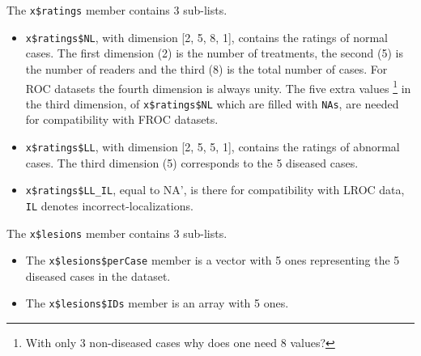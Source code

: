 \documentclass[
]{book}
\newenvironment{Shaded}{\begin{snugshade}}{\end{snugshade}}
\newcommand{\CommentTok}[1]{\textcolor[rgb]{0.56,0.35,0.01}{\textit{#1}}}
\newcommand{\FunctionTok}[1]{\textcolor[rgb]{0.00,0.00,0.00}{#1}}
\newcommand{\NormalTok}[1]{#1}
\newcommand{\SpecialCharTok}[1]{\textcolor[rgb]{0.00,0.00,0.00}{#1}}
\begin{document}
The \texttt{x\$ratings} member contains 3 sub-lists.

\begin{Shaded}
\end{Shaded}

\begin{itemize}
\item
  \texttt{x\$ratings\$NL}, with dimension {[}2, 5, 8, 1{]}, contains the ratings of normal cases. The first dimension (2) is the number of treatments, the second (5) is the number of readers and the third (8) is the total number of cases. For ROC datasets the fourth dimension is always unity. The five extra values \footnote{With only 3 non-diseased cases why does one need 8 values?} in the third dimension, of \texttt{x\$ratings\$NL} which are filled with \texttt{NAs}, are needed for compatibility with FROC datasets.
\item
  \texttt{x\$ratings\$LL}, with dimension {[}2, 5, 5, 1{]}, contains the ratings of abnormal cases. The third dimension (5) corresponds to the 5 diseased cases.
\item
  \texttt{x\$ratings\$LL\_IL}, equal to NA', is there for compatibility with LROC data, \texttt{IL} denotes incorrect-localizations.
\end{itemize}

The \texttt{x\$lesions} member contains 3 sub-lists.

\begin{Shaded}
\end{Shaded}

\begin{itemize}
\item
  The \texttt{x\$lesions\$perCase} member is a vector with 5 ones representing the 5 diseased cases in the dataset.
\item
  The \texttt{x\$lesions\$IDs} member is an array with 5 ones.
\end{itemize}
\end{document}
